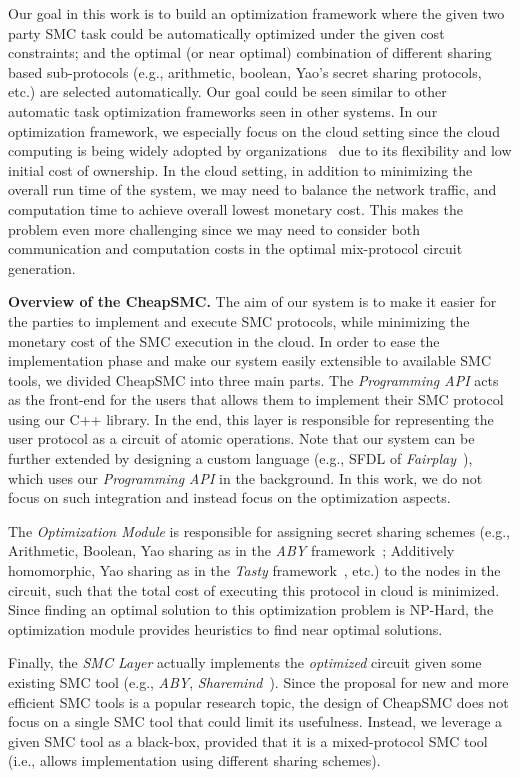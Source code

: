 \documentclass{llncs}
\newcommand{\sysname}{{CheapSMC}\xspace}
\begin{document}
Our goal in this work is to build an optimization framework where the given two party SMC task could be automatically optimized under the given cost constraints; and the optimal (or near optimal) combination of different sharing based sub-protocols (e.g., arithmetic, boolean, Yao's secret sharing protocols, etc.) are selected automatically.  Our goal could be seen similar to other automatic task optimization frameworks seen in other systems. In our optimization framework, we especially focus on the cloud setting since the cloud computing is being widely adopted by organizations~\cite{cite:forbes} due to its flexibility and low initial cost of ownership. In the cloud setting, in addition to minimizing the overall run time of the system, we may need to balance the network traffic, and computation time to achieve overall lowest monetary cost. This makes the problem even more challenging since we may need to consider both communication and computation costs in the optimal mix-protocol circuit generation. 

\textbf{Overview of the \sysname.} The aim of our system is to make it easier for the parties to implement and execute SMC protocols, while minimizing the monetary cost of the SMC execution in the cloud. In order to ease the implementation phase and make our system easily extensible to available SMC tools, we divided \sysname into three main parts. The \emph{Programming API} acts as the front-end for the users that allows them to implement their SMC protocol using our C++ library. In the end, this layer is responsible for representing the user protocol as a circuit of atomic operations. Note that our system can be further extended by designing a custom language (e.g., SFDL of \emph{Fairplay}~\cite{cite:malkhi2004fairplay}), which uses our \emph{Programming API} in the background. In this work, we do not
focus on such integration and instead focus on the optimization aspects.

The \emph{Optimization Module} is responsible for assigning secret sharing schemes (e.g., Arithmetic, Boolean, Yao sharing as in the \emph{ABY} framework~\cite{cite:demmler2015aby}; Additively homomorphic, Yao sharing as in the \emph{Tasty} framework~\cite{cite:henecka2010tasty}, etc.) to the nodes in the circuit, such that the total cost of executing this protocol in cloud is minimized. Since finding an optimal solution to this optimization problem is NP-Hard, the optimization module provides heuristics to find near optimal solutions.

Finally, the \emph{SMC Layer} actually implements the \emph{optimized} circuit given some existing SMC tool (e.g., \emph{ABY}, \emph{Sharemind}~\cite{cite:bogdanov2008sharemind}). Since the proposal for new and more efficient SMC tools is a popular research topic, the design of \sysname does not focus on a single SMC tool that could limit its usefulness. Instead, we leverage a given SMC tool as a black-box, provided that it is a mixed-protocol SMC tool (i.e., allows implementation using different sharing schemes). 
\end{document}
